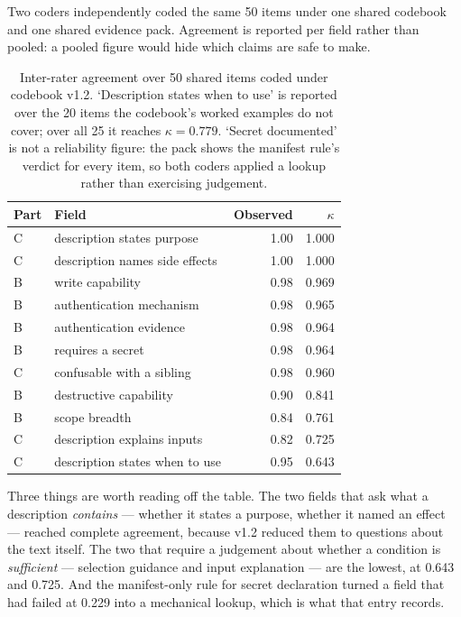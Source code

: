 \documentclass[a4paper,fleqn]{cas-dc}
\begin{document}
Two coders independently coded the same 50 items under one shared codebook and
one shared evidence pack. Agreement is reported per field rather than pooled: a
pooled figure would hide which claims are safe to make.

\begin{table}[t]
\caption{Inter-rater agreement over 50 shared items coded under codebook v1.2.
`Description states when to use' is reported over the 20 items the codebook's
worked examples do not cover; over all 25 it reaches $\kappa=0.779$. `Secret
documented' is not a reliability figure: the pack shows the manifest rule's
verdict for every item, so both coders applied a lookup rather than exercising
judgement.}
\label{tab:kappa}
\centering
\begin{tabular}{@{}llrr@{}}
\toprule
Part & Field & Observed & $\kappa$ \\
\midrule
C & description states purpose & 1.00 & 1.000 \\
C & description names side effects & 1.00 & 1.000 \\
B & write capability & 0.98 & 0.969 \\
B & authentication mechanism & 0.98 & 0.965 \\
B & authentication evidence & 0.98 & 0.964 \\
B & requires a secret & 0.98 & 0.964 \\
C & confusable with a sibling & 0.98 & 0.960 \\
B & destructive capability & 0.90 & 0.841 \\
B & scope breadth & 0.84 & 0.761 \\
C & description explains inputs & 0.82 & 0.725 \\
C & description states when to use & 0.95 & 0.643 \\
\bottomrule
\end{tabular}
\end{table}

Three things are worth reading off the table. The two fields that ask what a
description \emph{contains} --- whether it states a purpose, whether it named an
effect --- reached complete agreement, because v1.2 reduced them to questions
about the text itself. The two that require a judgement about whether a
condition is \emph{sufficient} --- selection guidance and input explanation ---
are the lowest, at 0.643 and 0.725. And the manifest-only rule for secret
declaration turned a field that had failed at 0.229 into a mechanical lookup,
which is what that entry records.
\end{document}
